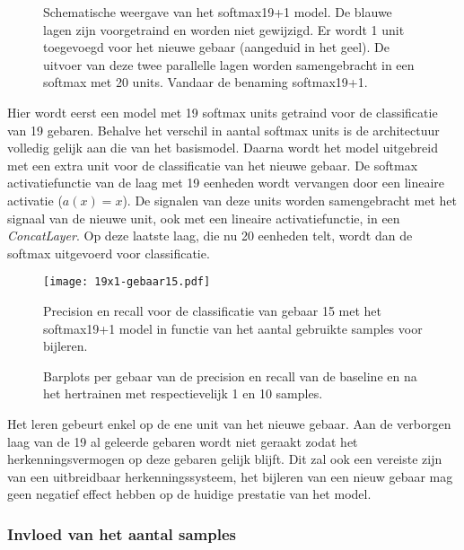 \begin{figure}
	\centering
	\def\svgwidth{0.7\columnwidth}
	
	\caption{Schematische weergave van het softmax19+1 model. De blauwe lagen zijn voorgetraind en worden niet gewijzigd. Er wordt 1 unit toegevoegd voor het nieuwe gebaar (aangeduid in het geel). De uitvoer van deze twee parallelle lagen worden samengebracht in een softmax met 20 units. Vandaar de benaming softmax19+1. }\label{fig:19+1}
\end{figure}

\npar Hier wordt eerst een model met 19 softmax units getraind voor de classificatie van 19 gebaren. Behalve het verschil in aantal softmax units is de architectuur volledig gelijk aan die van het basismodel. Daarna wordt het model uitgebreid met een extra unit voor de classificatie van het nieuwe gebaar. De softmax activatiefunctie van de laag met 19 eenheden wordt vervangen door een lineaire activatie ($a(x)=x$). De signalen van deze units worden samengebracht met het signaal van de nieuwe unit, ook met een lineaire activatiefunctie, in een \textit{ConcatLayer}.  Op deze laatste laag, die nu 20 eenheden telt, wordt dan de softmax uitgevoerd voor classificatie.

\begin{figure}
	\centering
	\texttt{[image: 19x1-gebaar15.pdf]}
	\caption{Precision en recall voor de classificatie van gebaar 15 met het softmax19+1 model in functie van het aantal gebruikte samples voor bijleren.}\label{fig:19x1-gebaar15}
	
		\vspace{0.5cm}
		\def\svgwidth{1.1\columnwidth}
		
		\caption{Barplots per gebaar van de precision en recall van de baseline en na het hertrainen met respectievelijk 1 en 10 samples. }\label{fig:19x1-all}
\end{figure}

\npar Het leren gebeurt enkel op de ene unit van het nieuwe gebaar. Aan de verborgen laag van de 19 al geleerde gebaren wordt niet geraakt zodat het herkenningsvermogen op deze gebaren gelijk blijft. Dit zal ook een vereiste zijn van een uitbreidbaar herkenningssysteem, het bijleren van een nieuw gebaar mag geen negatief effect hebben op de huidige prestatie van het model.

\subsubsection{Invloed van het aantal samples}

